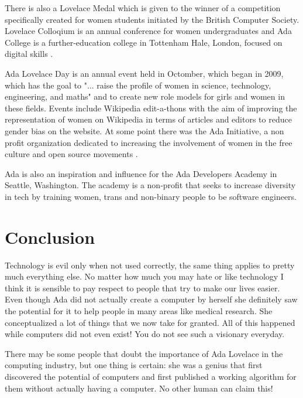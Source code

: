 \documentclass{article}
\begin{document}
\vspace{0.3cm}

There is also a Lovelace Medal which is given to the winner of a competition specifically created for women students initiated by the British Computer Society. Lovelace Colloqium is an annual conference for women undergraduates and Ada College is a further-education college in Tottenham Hale, London, focused on digital skills \cite{AdaCollege}.

\vspace{0.3cm}

Ada Lovelace Day is an annual event held in Octomber, which began in 2009, which has the goal to "... raise the profile of women in science, technology, engineering, and maths" and to create new role models for girls and women in these fields. Events include Wikipedia edit-a-thons \cite{Editathon} with the aim of improving the representation of women on Wikipedia in terms of articles and editors to reduce gender bias on the website. At some point there was the Ada Initiative, a non profit organization dedicated to increasing the involvement of women in the free culture and open source movements \cite{OpenSource}.

\vspace{0.3cm}

Ada is also an inspiration and influence for the Ada Developers Academy in Seattle, Washington. The academy is a non-profit that seeks to increase diversity in tech by training women, trans and non-binary people to be software engineers.

\newpage

\section{Conclusion}

Technology is evil only when not used correctly, the same thing applies to pretty much everything else. No matter how much you may hate or like technology I think it is sensible to pay respect to people that try to make our lives easier. Even though Ada did not actually create a computer by herself she definitely saw the potential for it to help people in many areas like medical research. She conceptualized a lot of things that we now take for granted. All of this happened while computers did not even exist! You do not see such a visionary everyday.

\vspace{0.3cm}

There may be some people that doubt the importance of Ada Lovelace in the computing industry, but one thing is certain: she was a genius that first discovered the potential of computers and first published a working algorithm for them without actually having a computer. No other human can claim this!

\newpage

\printbibliography[title={Bibliography}]
\end{document}
